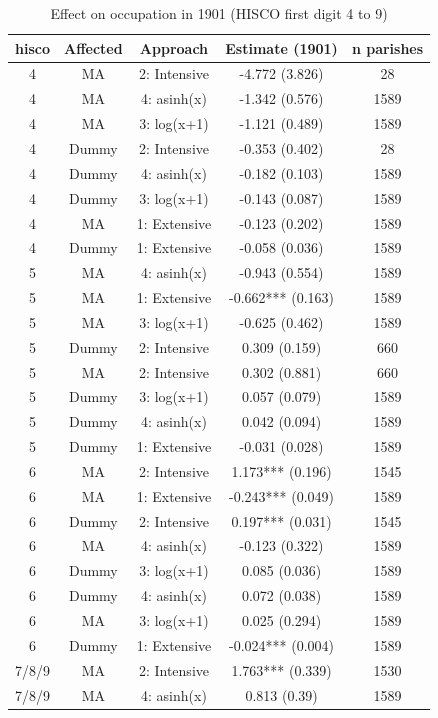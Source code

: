 \begin{table}[]
    \centering
    \caption{\label{tab:occ2} Effect on occupation in 1901 (HISCO first digit 4 to 9)}
    \footnotesize
    \begin{tabular}{ccccc}
\toprule
hisco & Affected & Approach & Estimate (1901) & n parishes\\
\midrule
4 & MA & 2: Intensive & -4.772 (3.826) & 28\\
4 & MA & 4: asinh(x) & -1.342 (0.576) & 1589\\
4 & MA & 3: log(x+1) & -1.121 (0.489) & 1589\\
4 & Dummy & 2: Intensive & -0.353 (0.402) & 28\\
4 & Dummy & 4: asinh(x) & -0.182 (0.103) & 1589\\
4 & Dummy & 3: log(x+1) & -0.143 (0.087) & 1589\\
4 & MA & 1: Extensive & -0.123 (0.202) & 1589\\
4 & Dummy & 1: Extensive & -0.058 (0.036) & 1589\\
5 & MA & 4: asinh(x) & -0.943 (0.554) & 1589\\
5 & MA & 1: Extensive & -0.662*** (0.163) & 1589\\
5 & MA & 3: log(x+1) & -0.625 (0.462) & 1589\\
5 & Dummy & 2: Intensive & 0.309 (0.159) & 660\\
5 & MA & 2: Intensive & 0.302 (0.881) & 660\\
5 & Dummy & 3: log(x+1) & 0.057 (0.079) & 1589\\
5 & Dummy & 4: asinh(x) & 0.042 (0.094) & 1589\\
5 & Dummy & 1: Extensive & -0.031 (0.028) & 1589\\
6 & MA & 2: Intensive & 1.173*** (0.196) & 1545\\
6 & MA & 1: Extensive & -0.243*** (0.049) & 1589\\
6 & Dummy & 2: Intensive & 0.197*** (0.031) & 1545\\
6 & MA & 4: asinh(x) & -0.123 (0.322) & 1589\\
6 & Dummy & 3: log(x+1) & 0.085 (0.036) & 1589\\
6 & Dummy & 4: asinh(x) & 0.072 (0.038) & 1589\\
6 & MA & 3: log(x+1) & 0.025 (0.294) & 1589\\
6 & Dummy & 1: Extensive & -0.024*** (0.004) & 1589\\
7/8/9 & MA & 2: Intensive & 1.763*** (0.339) & 1530\\
7/8/9 & MA & 4: asinh(x) & 0.813 (0.39) & 1589\\

\end{tabular}
\end{table}
